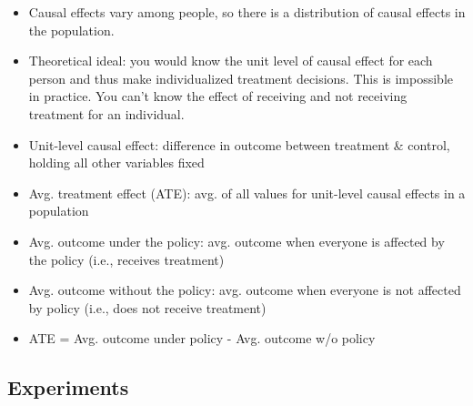 \documentclass[]{book}
\providecommand{\tightlist}{%
  \setlength{\itemsep}{0pt}\setlength{\parskip}{0pt}}
\begin{document}
\begin{itemize}
  \begin{itemize}
  \tightlist
  \item
    Causal effects vary among people, so there is a distribution of causal effects in the population.
  \item
    Theoretical ideal: you would know the unit level of causal effect for each person and thus make individualized treatment decisions. This is impossible in practice. You can't know the effect of receiving and not receiving treatment for an individual.
  \item
    Unit-level causal effect: difference in outcome between treatment \& control, holding all other variables fixed
  \item
    Avg. treatment effect (ATE): avg. of all values for unit-level causal effects in a population
  \item
    Avg. outcome under the policy: avg. outcome when everyone is affected by the policy (i.e., receives treatment)
  \item
    Avg. outcome without the policy: avg. outcome when everyone is not affected by policy (i.e., does not receive treatment)
  \item
    ATE = Avg. outcome under policy - Avg. outcome w/o policy
  \end{itemize}
\end{itemize}

\hypertarget{experiments}{%
\subsection{Experiments}\label{experiments}}
\end{document}
